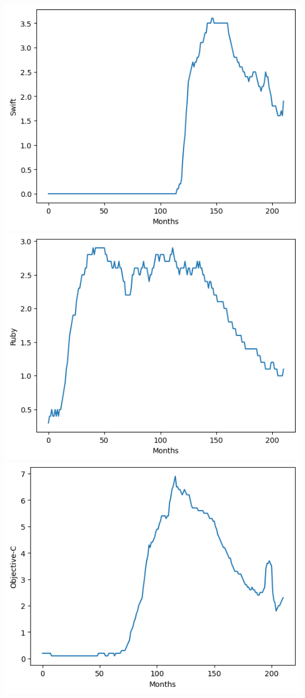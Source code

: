 \documentclass[conference]{IEEEtran}
\begin{document}
\noindent
\includegraphics[scale=0.4]{lineplot/swift.png}
\includegraphics[scale=0.4]{lineplot/ruby.png}
\includegraphics[scale=0.4]{lineplot/objective-c.png}
\end{document}
